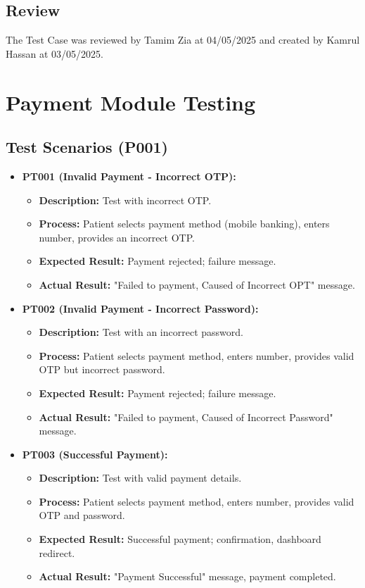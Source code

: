 \documentclass{article}
\begin{document}
\subsection{Review}
The Test Case was reviewed by Tamim Zia at 04/05/2025 and created by Kamrul Hassan at 03/05/2025.

\section{Payment Module Testing}

\subsection{Test Scenarios (P001)}

\begin{itemize}
    \item \textbf{PT001 (Invalid Payment - Incorrect OTP):}
    \begin{itemize}
        \item \textbf{Description:} Test with incorrect OTP.
        \item \textbf{Process:} Patient selects payment method (mobile banking), enters number, provides an incorrect OTP.
        \item \textbf{Expected Result:} Payment rejected; failure message.
        \item \textbf{Actual Result:} "Failed to payment, Caused of Incorrect OPT" message.
    \end{itemize}
    \item \textbf{PT002 (Invalid Payment - Incorrect Password):}
    \begin{itemize}
        \item \textbf{Description:} Test with an incorrect password.
        \item \textbf{Process:} Patient selects payment method, enters number, provides valid OTP but incorrect password.
        \item \textbf{Expected Result:} Payment rejected; failure message.
        \item \textbf{Actual Result:} "Failed to payment, Caused of Incorrect Password" message.
    \end{itemize}
    \item \textbf{PT003 (Successful Payment):}
    \begin{itemize}
        \item \textbf{Description:} Test with valid payment details.
        \item \textbf{Process:} Patient selects payment method, enters number, provides valid OTP and password.
        \item \textbf{Expected Result:} Successful payment; confirmation, dashboard redirect.
        \item \textbf{Actual Result:} "Payment Successful" message, payment completed.
    \end{itemize}
\end{itemize}
\end{document}
